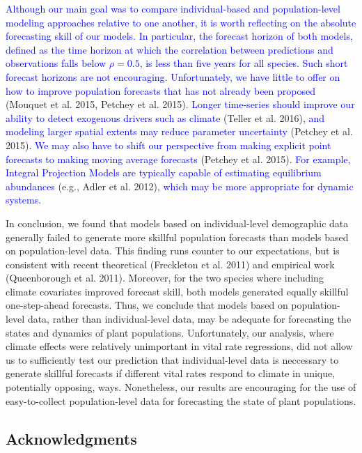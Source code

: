 \documentclass[12pt,]{article}
\begin{document}
\textcolor{blue}{Although our main goal was to compare individual-based and population-level modeling approaches relative to one another, it is worth reflecting on the absolute forecasting skill of our models.
In particular, the forecast horizon of both models, defined as the time horizon at which the correlation between predictions and observations falls below $\rho = 0.5$, is less than five years for all species. 
Such short forecast horizons are not encouraging.}
\textcolor{blue}{Unfortunately, we have little to offer on how to improve population forecasts that has not already been proposed}
(Mouquet et al. 2015, Petchey et al. 2015).
\textcolor{blue}{Longer time-series should improve our ability to detect exogenous drivers such as climate}
(Teller et al. 2016),
\textcolor{blue}{and modeling larger spatial extents may reduce parameter uncertainty}
(Petchey et al. 2015).
\textcolor{blue}{We may also have to shift our perspective from making explicit point forecasts to making moving average forecasts}
(Petchey et al. 2015).
\textcolor{blue}{For example, Integral Projection Models are typically capable of estimating equilibrium abundances}
(e.g., Adler et al. 2012),
\textcolor{blue}{which may be more appropriate for dynamic systems.}

In conclusion, we found that models based on individual-level
demographic data generally failed to generate more skillful population
forecasts than models based on population-level data. This finding runs
counter to our expectations, but is consistent with recent theoretical
(Freckleton et al. 2011) and empirical work (Queenborough et al. 2011).
Moreover, for the two species where including climate covariates
improved forecast skill, both models generated equally skillful
one-step-ahead forecasts. Thus, we conclude that models based on
population-level data, rather than individual-level data, may be
adequate for forecasting the states and dynamics of plant populations.
Unfortunately, our analysis, where climate effects were relatively
unimportant in vital rate regressions, did not allow us to sufficiently
test our prediction that individual-level data is neccessary to generate
skillful forecasts if different vital rates respond to climate in
unique, potentially opposing, ways. Nonetheless, our results are
encouraging for the use of easy-to-collect population-level data for
forecasting the state of plant populations.

\subsection{Acknowledgments}\label{acknowledgments}
\end{document}
